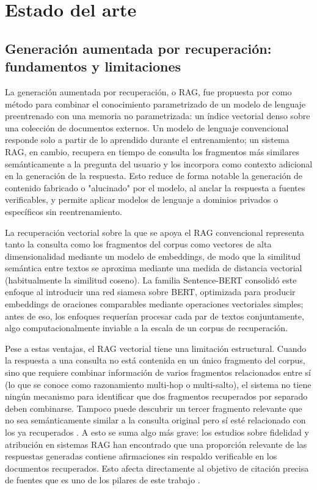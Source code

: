 \documentclass[11pt,a4paper,spanish]{book}
\numberwithin{equation}{chapter}
\numberwithin{figure}{chapter}
\numberwithin{table}{chapter}
\begin{document}
\section{Estado del arte}

\subsection{Generación aumentada por recuperación: fundamentos y limitaciones}

La generación aumentada por recuperación, o RAG, fue propuesta por  como método para combinar el conocimiento parametrizado de un modelo de lenguaje preentrenado con una memoria no parametrizada: un índice vectorial denso sobre una colección de documentos externos. Un modelo de lenguaje convencional responde solo a partir de lo aprendido durante el entrenamiento; un sistema RAG, en cambio, recupera en tiempo de consulta los fragmentos más similares semánticamente a la pregunta del usuario y los incorpora como contexto adicional en la generación de la respuesta. Esto reduce de forma notable la generación de contenido fabricado o "alucinado" por el modelo, al anclar la respuesta a fuentes verificables, y permite aplicar modelos de lenguaje a dominios privados o específicos sin reentrenamiento.

La recuperación vectorial sobre la que se apoya el RAG convencional representa tanto la consulta como los fragmentos del corpus como vectores de alta dimensionalidad mediante un modelo de embeddings, de modo que la similitud semántica entre textos se aproxima mediante una medida de distancia vectorial (habitualmente la similitud coseno). La familia Sentence-BERT \cite{reimers2019sbert} consolidó este enfoque al introducir una red siamesa sobre BERT, optimizada para producir embeddings de oraciones comparables mediante operaciones vectoriales simples; antes de eso, los enfoques requerían procesar cada par de textos conjuntamente, algo computacionalmente inviable a la escala de un corpus de recuperación.

Pese a estas ventajas, el RAG vectorial tiene una limitación estructural. Cuando la respuesta a una consulta no está contenida en un único fragmento del corpus, sino que requiere combinar información de varios fragmentos relacionados entre sí (lo que se conoce como razonamiento multi-hop o multi-salto), el sistema no tiene ningún mecanismo para identificar que dos fragmentos recuperados por separado deben combinarse. Tampoco puede descubrir un tercer fragmento relevante que no sea semánticamente similar a la consulta original pero sí esté relacionado con los ya recuperados \cite{peng2024graphragsurvey}. A esto se suma algo más grave: los estudios sobre fidelidad y atribución en sistemas RAG han encontrado que una proporción relevante de las respuestas generadas contiene afirmaciones sin respaldo verificable en los documentos recuperados. Esto afecta directamente al objetivo de citación precisa de fuentes que es uno de los pilares de este trabajo \cite{attributionsurvey2026}.
\end{document}
